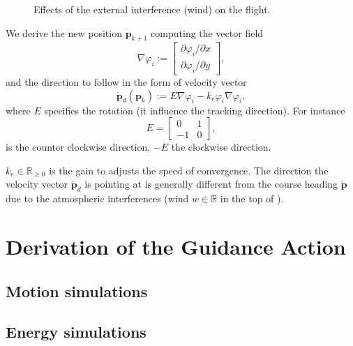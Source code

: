 \begin{figure}[h]
  \centering
  
  \caption[External interference on the path]{Effects of the external interference (wind) on the flight.}
  \label{fig:tee3}
\end{figure}

We derive the new position $\mathbf{p}_{k+1}$ computing the vector field 
 \begin{equation}
   \nabla\varphi_i:=\begin{bmatrix}\partial\varphi_i/\partial x \\ \partial\varphi_i/\partial y\end{bmatrix},  
 \end{equation}
 and the direction to follow in the form of velocity vector~\cite{de2017guidance}
 \begin{equation}\label{eq:pd}
   \dot{\mathbf{p}}_d(\mathbf{p}_k):=E\nabla\varphi_i-k_e\varphi_i\nabla\varphi_i,
 \end{equation}
 where $E$ specifies the rotation (it influence the tracking direction). For instance
 \begin{equation}
   E=\begin{bmatrix}
     0&1\\-1&0
   \end{bmatrix},
 \end{equation}
 is the counter clockwise direction, $-E$ the clockwise direction. 
 
 $k_e\in\mathbb{R}_{\geq 0}$ is the gain to adjusts the speed of convergence. The direction the velocity vector $\dot{\mathbf{p}}_d$ is pointing at is generally different from the course heading $\dot{\mathbf{p}}$ due to the atmospheric interferences (wind $w\in\mathbb{R}$ in the top of ).

\section{\color{red}Derivation of the Guidance Action}

\subsection{\color{red}Motion simulations}

\subsection{\color{red}Energy simulations}


